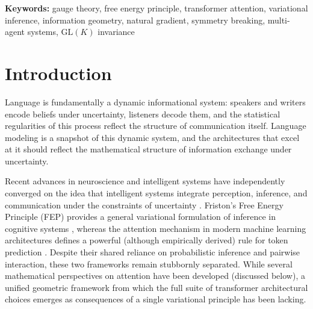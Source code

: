 \documentclass[twoside,11pt]{article}
\begin{document}
\begin{abstract}
We validate the unreduced theory by training a $\mathrm{GL}(K)$ gauge transformer on WikiText-103 using only KL divergences, gauge transport, and natural gradient dynamics---without learned attention projections, MLPs, or pointwise activation functions. The model achieves test perplexity 71.6, outperforming a standard transformer at matched embedding dimension by $1.66\times$ (PPL~118.6 at $d_{\text{model}} = 90$) while approaching a parameter-matched standard transformer (PPL~48.5 at $d_{\text{model}} = 1{,}280$). The learned gauge frames develop categorical separation in a low-dimensional subspace with within-category diversification in the bulk. A separate consistency check on frozen BERT across 105 passages confirms quantitative agreement between KL-based and dot-product attention in the degenerate limit (grand mean $r = 0.804$, 95\% CI $[0.771, 0.838]$). Both architectures operate in the flat bundle limit with trivially vanishing holonomy, a geometric regime we hypothesize is matched to the approximately path-independent semantic transport that compositional language requires.
\end{abstract}

\noindent\textbf{Keywords:} gauge theory, free energy principle, transformer attention, variational inference, information geometry, natural gradient, symmetry breaking, multi-agent systems, $\mathrm{GL}(K)$ invariance

\section{Introduction}

Language is fundamentally a dynamic informational system: speakers and writers encode beliefs under uncertainty, listeners decode them, and the statistical regularities of this process reflect the structure of communication itself. Language modeling is a snapshot of this dynamic system, and the architectures that excel at it should reflect the mathematical structure of information exchange under uncertainty.

Recent advances in neuroscience and intelligent systems have independently converged on the idea that intelligent systems integrate perception, inference, and communication under the constraints of uncertainty \citep{bahdanau2014neural,amari1998natural,bronstein2021geometric,foerster2016learning,wooldridge2009introduction}. Friston's Free Energy Principle (FEP) provides a general variational formulation of inference in cognitive systems \citep{friston2010free,parr2022active,friston2017graphical,ramstead2020variational}, whereas the attention mechanism in modern machine learning architectures defines a powerful (although empirically derived) rule for token prediction \citep{clark2019does,vaswani2017attention}. Despite their shared reliance on probabilistic inference and pairwise interaction, these two frameworks remain stubbornly separated. While several mathematical perspectives on attention have been developed (discussed below), a unified geometric framework from which the full suite of transformer architectural choices emerges as consequences of a single variational principle has been lacking.
\end{document}
